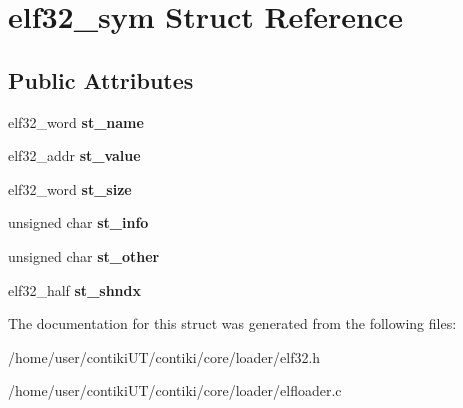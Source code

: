 \hypertarget{structelf32__sym}{}\section{elf32\+\_\+sym Struct Reference}
\label{structelf32__sym}
\subsection*{Public Attributes}
\begin{DoxyCompactItemize}
\item 
\hypertarget{structelf32__sym_a14545ec8738f87d6ac8da1d4a601d024}{}elf32\+\_\+word {\bfseries st\+\_\+name}\label{structelf32__sym_a14545ec8738f87d6ac8da1d4a601d024}

\item 
\hypertarget{structelf32__sym_a39b94d141bae73d0c1d8f6df5695ea2d}{}elf32\+\_\+addr {\bfseries st\+\_\+value}\label{structelf32__sym_a39b94d141bae73d0c1d8f6df5695ea2d}

\item 
\hypertarget{structelf32__sym_aef3af325acfa8080431f06de9267c662}{}elf32\+\_\+word {\bfseries st\+\_\+size}\label{structelf32__sym_aef3af325acfa8080431f06de9267c662}

\item 
\hypertarget{structelf32__sym_aeef86f71df370cf183e2d03afe4d8812}{}unsigned char {\bfseries st\+\_\+info}\label{structelf32__sym_aeef86f71df370cf183e2d03afe4d8812}

\item 
\hypertarget{structelf32__sym_a5ce8408912eda365e2e3246f81f98360}{}unsigned char {\bfseries st\+\_\+other}\label{structelf32__sym_a5ce8408912eda365e2e3246f81f98360}

\item 
\hypertarget{structelf32__sym_a03dbc7e19d4f2f9aac76bf99d218658b}{}elf32\+\_\+half {\bfseries st\+\_\+shndx}\label{structelf32__sym_a03dbc7e19d4f2f9aac76bf99d218658b}

\end{DoxyCompactItemize}


The documentation for this struct was generated from the following files\+:\begin{DoxyCompactItemize}
\item 
/home/user/contiki\+U\+T/contiki/core/loader/elf32.\+h\item 
/home/user/contiki\+U\+T/contiki/core/loader/elfloader.\+c\end{DoxyCompactItemize}
